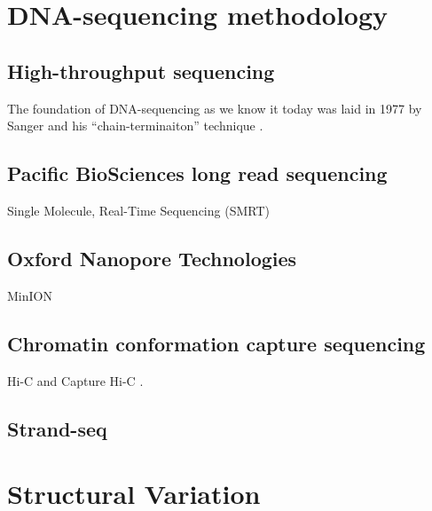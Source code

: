 \section{DNA-sequencing methodology}


\subsection{High-throughput sequencing}
\label{sec:hts}

The foundation of DNA-sequencing as we know it today was laid in 1977 by
Sanger and his ``chain-terminaiton'' technique \citep{Sanger1977}.


\subsection{Pacific BioSciences\texorpdfstring{\textsuperscript{\textregistered}}{(R)} long read sequencing}
\label{sec:pacbio}
Single Molecule, Real-Time Sequencing (SMRT\textsuperscript{\textregistered})


\subsection{Oxford Nanopore Technologies\texorpdfstring{\textsuperscript{\textregistered}}{{R}}}
\label{sec:ont}
MinION\textregistered


\subsection{Chromatin conformation capture sequencing}
\label{sec:ccc}

Hi-C \citep{Lieberman-Aiden2009} and Capture Hi-C \citep{Dryden2014,Schoenfelder2015,Jager2015,Mifsud2015}.

\subsection{Strand-seq}
\label{sec:strandseq}

\section{Structural Variation}
\label{sec:sv}
